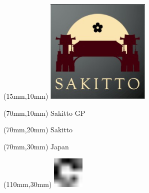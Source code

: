 \null\newpage
\begin{textblock*}{50mm}(15mm,10mm)%
\includegraphics[width=50mm]{LG/2015-05-20_00093.png}
\end{textblock*}
\begin{textblock*}{130mm}(70mm,10mm)%
{\fontsize{20}{20}\selectfont Sakitto GP}\\
\end{textblock*}
\begin{textblock*}{120mm}(70mm,20mm)%
{\fontsize{16}{16}\selectfont Sakitto}\\
\end{textblock*}
\begin{textblock*}{120mm}(70mm,30mm)%
{\fontsize{12}{12}\selectfont Japan}
\end{textblock*}
\begin{textblock*}{30mm}(110mm,30mm)%
\centering
\includegraphics[height=15mm]{icons/fa-rotate-right.pdf}
\end{textblock*}
